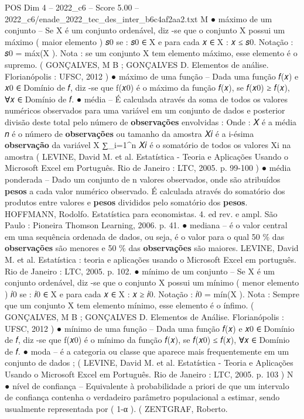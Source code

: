 \begin{textsample}{POS Dim 4 – 2022\_c6 – Score 5.00 – 2022\_c6/enade\_2022\_tec\_des\_inter\_b6c4af2aa2.txt}
M {\EmojiFont ●} máximo de um conjunto – Se X é um conjunto ordenável, diz -se que o conjunto X possui um máximo ( maior elemento ) 𝑠0 se : 𝑠0 ∈ X e para cada 𝑥 ∈ X : 𝑥 ≤ 𝑠0.
Notação : 𝑠0 = máx(X ).
Nota : se um conjunto X tem elemento máximo, esse elemento é o supremo. ( GONÇALVES, M B ; GONÇALVES D.
Elementos de análise.
Florianópolis : UFSC, 2012 ) {\EmojiFont ●} máximo de uma função – Dada uma função 𝑓(𝑥) e 𝑥0 ∈ Domínio de 𝑓, diz -se que f(𝑥0) é o máximo da função 𝑓(𝑥), se 𝑓(𝑥0) ≥ 𝑓(𝑥), ∀𝑥 ∈ Domínio de 𝑓. {\EmojiFont ●} média – É calculada através da soma de todos os valores numéricos observados para uma variável em um conjunto de dados e posterior divisão deste total pelo número de \textbf{observações} envolvidas : Onde : 𝑋 é a média 𝑛 é o número de \textbf{observações} ou tamanho da amostra 𝑋𝑖 é a i-ésima \textbf{observação} da variável X ∑\_i=1\textasciicircum{}n 𝑋𝑖 é o somatório de todos os valores Xi na amostra ( LEVINE, David M. et al.
Estatística - Teoria e Aplicações Usando o Microsoft Excel em Português.
Rio de Janeiro : LTC, 2005. p. 99-100 ) {\EmojiFont ●} média ponderada – Dado um conjunto de n valores observados, onde são atribuídos \textbf{pesos} a cada valor numérico observado.
É calculada através do somatório dos produtos entre valores e \textbf{pesos} divididos pelo somatório dos \textbf{pesos}.
HOFFMANN, Rodolfo.
Estatística para economistas. 4. ed rev. e ampl.
São Paulo : Pioneira Thomson Learning, 2006. p. 41. {\EmojiFont ●} mediana – é o valor central em uma sequência ordenada de dados, ou seja, é o valor para o qual 50 \% das \textbf{observações} são menores e 50 \% das \textbf{observações} são maiores.
LEVINE, David M. et al.
Estatística : teoria e aplicações usando o Microsoft Excel em português.
Rio de Janeiro : LTC, 2005. p. 102. {\EmojiFont ●} mínimo de um conjunto – Se X é um conjunto ordenável, diz -se que o conjunto X possui um mínimo ( menor elemento ) 𝑖0 se : 𝑖0 ∈ X e para cada 𝑥 ∈ X : 𝑥 ≥ 𝑖0.
Notação : 𝑖0 = mín(X ).
Nota : Sempre que um conjunto X tem elemento mínimo, esse elemento é o ínfimo. ( GONÇALVES, M B ; GONÇALVES D.
Elementos de Análise.
Florianópolis : UFSC, 2012 ) {\EmojiFont ●} mínimo de uma função – Dada uma função 𝑓(𝑥) e 𝑥0 ∈ Domínio de 𝑓, diz -se que f(𝑥0) é o mínimo da função 𝑓(𝑥), se 𝑓(𝑥0) ≤ 𝑓(𝑥), ∀𝑥 ∈ Domínio de 𝑓. {\EmojiFont ●} moda – é a categoria ou classe que aparece mais frequentemente em um conjunto de dados ; ( LEVINE, David M. et al.
Estatística - Teoria e Aplicações Usando o Microsoft Excel em Português.
Rio de Janeiro : LTC, 2005. p. 103 ) N {\EmojiFont ●} nível de confiança – Equivalente à probabilidade a priori de que um intervalo de confiança contenha o verdadeiro parâmetro populacional a estimar, sendo usualmente representada por ( 1-α ). ( ZENTGRAF, Roberto.

\end{textsample}
